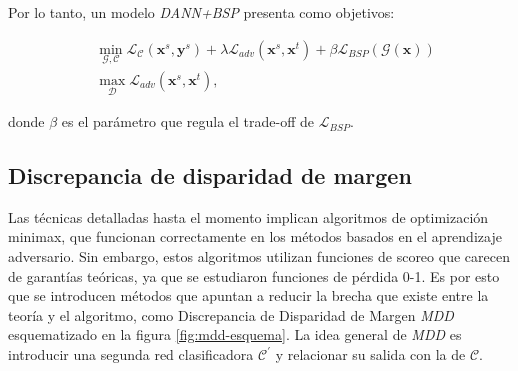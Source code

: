 Por lo tanto, un modelo {\it DANN+BSP} presenta como objetivos:

\begin{align}
   & \min_{\mathcal{G},\mathcal{C}} \mathcal{L}_\mathcal{C}(\mathbf{x}^s, \mathbf{y}^s) + \lambda \mathcal{L}_{adv}(\mathbf{x}^s, \mathbf{x}^t) + \beta \mathcal{L}_{BSP}(\mathcal{G}(\mathbf{x})) \\
   & \max_{\mathcal{D}} \mathcal{L}_{adv}(\mathbf{x}^s, \mathbf{x}^t),
  \label{eq:bsp-dann-obejtivo}
\end{align}

\noindent
donde $\beta$ es el parámetro que regula el trade-off de $\mathcal{L}_{BSP}$.

\subsection{Discrepancia de disparidad de margen}

Las técnicas detalladas hasta el momento implican algoritmos de optimización minimax, que funcionan correctamente en
los métodos basados en el aprendizaje adversario. Sin embargo, estos algoritmos utilizan funciones de scoreo que
carecen de garantías teóricas, ya que se estudiaron funciones de pérdida 0-1. Es por esto que se introducen métodos que
apuntan a reducir la brecha que existe entre la teoría y el algoritmo, como Discrepancia de Disparidad de Margen {\it
    MDD} \parencite{zhang2019bridging} esquematizado en la figura \ref{fig:mdd-esquema}. La idea general de {\it MDD} es introducir
una segunda red clasificadora $\mathcal{C}^{'}$ y relacionar su salida con la de $\mathcal{C}$.

